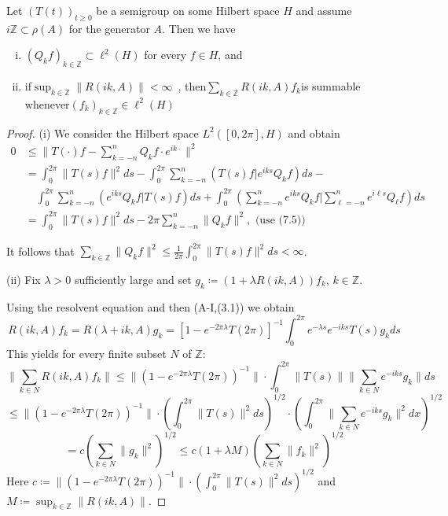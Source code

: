 \begin{lemma}\label{lem:a3-7.9}
	Let $(T(t))_{t\geq 0}$ be a semigroup on some Hilbert space $H$ and assume $i\mathbb{Z} \subset \rho(A)$ for the generator $A$.
	Then we have


\newpage

\begin{enumerate}[(i)]
	\item $(Q_{k}f)_{k\in\mathbb{Z}} \subset \ell^{2}(H)$ for every $f \in H$, and
	
	\item if\quad $\sup_{k\in\mathbb{Z}}\|R(ik,A)\| < \infty$~, then\quad $\sum_{k\in\mathbb{Z}} R(ik,A)f_{k}$\quad is summable whenever\quad $(f_{k})_{k\in\mathbb{Z}} \in \ell^{2}(H)$
\end{enumerate}
\end{lemma}

\begin{proof}
	(i) We consider the Hilbert space $L^{2}([0,2\pi],H)$ and obtain
	\begin{align*}
		0 &\leq \|T(\cdot)f - \sum_{k=-n}^{n} Q_{k}f\cdot e^{ik\cdot}\|^{2} \\
		&= \int_{0}^{2\pi} \|T(s)f\|^{2} ds - \int_{0}^{2\pi} \sum_{k=-n}^{n} (T(s)f|e^{iks}Q_{k}f) ds - \\
		&\quad \int_{0}^{2\pi} \sum_{k=-n}^{n} (e^{iks}Q_{k}f|T(s)f) ds + \int_{0}^{2\pi} (\sum_{k=-n}^{n} e^{iks}Q_{k}f|\sum_{\ell=-n}^{n} e^{i\ell s}Q_{\ell}f) ds \\
		&= \int_{0}^{2\pi} \|T(s)f\|^{2} ds - 2\pi\sum_{k=-n}^{n} \|Q_{k}f\|^{2}, \text{ (use (7.5))}
	\end{align*}
	
	It follows that $\sum_{k\in\mathbb{Z}} \|Q_{k}f\|^{2} \leq \frac{1}{2\pi}\int_{0}^{2\pi} \|T(s)f\|^{2} ds < \infty$.
	
	(ii) Fix $\lambda > 0$ sufficiently large and set $g_{k}\coloneqq (1 + \lambda R(ik,A))f_{k}$, $k \in \mathbb{Z}$.
	
	Using the resolvent equation and then (A-I,(3.1)) we obtain
	\[
	R(ik,A)f_{k} = R(\lambda + ik,A)g_{k} = [1 - e^{-2\pi\lambda}T(2\pi)]^{-1}\int_{0}^{2\pi} e^{-\lambda s}e^{-iks}T(s)g_{k} ds
	\]
	This yields for every finite subset $N$ of $\mathbb{Z}$:
	\[
	\|\sum_{k\in N} R(ik,A)f_{k}\| \leq \|(1 - e^{-2\pi\lambda}T(2\pi))^{-1}\|\cdot\int_{0}^{2\pi} \|T(s)\| \|\sum_{k\in N} e^{-iks}g_{k}\| ds 
	\]
	\[
		\leq \|(1 - e^{-2\pi\lambda}T(2\pi))^{-1}\|\cdot(\int_{0}^{2\pi}\|T(s)\|^{2} ds)^{1/2} \cdot (\int_{0}^{2\pi}\|\sum_{k\in N} e^{-iks}g_{k}\|^{2} dx)^{1/2} 
	\]
	\[
		= c(\sum_{k\in N} \|g_{k}\|^{2})^{1/2} \leq c(1 + \lambda M)(\sum_{k\in N} \|f_{k}\|^{2})^{1/2}
	\]
	Here $c\coloneqq \|(1 - e^{-2\pi\lambda}T(2\pi))^{-1}\|\cdot(\int_{0}^{2\pi}\|T(s)\|^{2} ds)^{1/2}$ and $M\coloneqq \sup_{k\in\mathbb{Z}}\|R(ik,A)\|$.
\end{proof}

